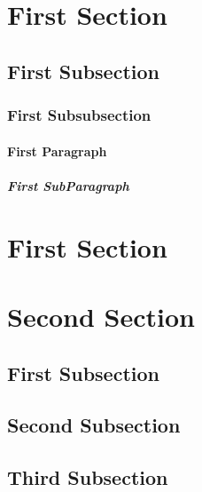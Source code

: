 ﻿\documentclass{article}
\begin{document}
\section{First Section}
\subsection{First Subsection}
\subsubsection{First Subsubsection}
\paragraph{First Paragraph}
\subparagraph{First SubParagraph}
\section{First Section}
\section{Second Section}
\subsection{First Subsection}
\subsection{Second Subsection}
\subsection{Third Subsection}
\end{document}
